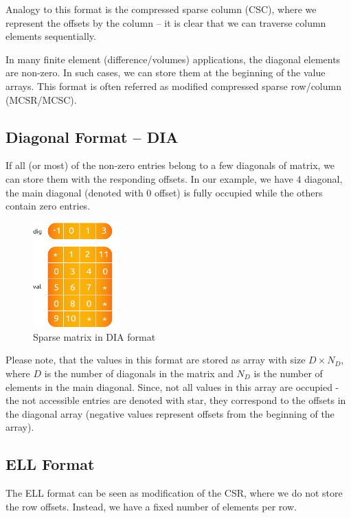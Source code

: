 Analogy to this format is the compressed sparse column (CSC), where we represent the offsets by the column -- it is clear that we can traverse column elements sequentially. 

In many finite element (difference/volumes) applications, the diagonal elements are non-zero. In such cases, we can store them at the beginning of the value arrays. This format is often referred as modified compressed sparse row/column (MCSR/MCSC).

\subsection{Diagonal Format -- DIA}

If all (or most) of the non-zero entries belong to a few diagonals of matrix, we can store them with the responding offsets. In our example, we have $4$ diagonal, the main diagonal (denoted with $0$ offset) is fully occupied while the others contain zero entries.

\begin{figure}[!ht]
\centering
\includegraphics[width=0.3\textwidth]{./fig/mat/dia.pdf}
\caption{Sparse matrix in DIA format}
\end{figure}

Please note, that the values in this format are stored as array with size $D \times N_{D}$, where $D$ is the number of diagonals in the matrix and $N_{D}$ is the number of elements in the main diagonal. Since, not all values in this array are occupied - the not accessible entries are denoted with star, they correspond to the offsets in the diagonal array (negative values represent offsets from the beginning of the array).


\subsection{ELL Format}

The ELL format can be seen as modification of the CSR, where we do not store the row offsets. Instead, we have a fixed number of elements per row.

